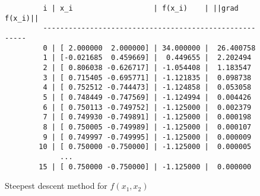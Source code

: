 \begin{solution}
  \begin{figure}[h]
    \centering
    \begin{verbatim}
         i | x_i                   | f(x_i)    | ||grad f(x_i)||
         -------------------------------------------------------
         0 | [ 2.000000  2.000000] | 34.000000 |  26.400758
         1 | [-0.021685  0.459669] |  0.449655 |  2.202494
         2 | [ 0.806038 -0.626717] | -1.054408 |  1.183547
         3 | [ 0.715405 -0.695771] | -1.121835 |  0.098738
         4 | [ 0.752512 -0.744473] | -1.124858 |  0.053058
         5 | [ 0.748449 -0.747569] | -1.124994 |  0.004426
         6 | [ 0.750113 -0.749752] | -1.125000 |  0.002379
         7 | [ 0.749930 -0.749891] | -1.125000 |  0.000198
         8 | [ 0.750005 -0.749989] | -1.125000 |  0.000107
         9 | [ 0.749997 -0.749995] | -1.125000 |  0.000009
        10 | [ 0.750000 -0.750000] | -1.125000 |  0.000005
             ...  
        15 | [ 0.750000 -0.750000] | -1.125000 |  0.000000
    \end{verbatim}
    \caption{Steepest descent method for $f(x_1, x_2)$}
  \end{figure}
\end{solution}
